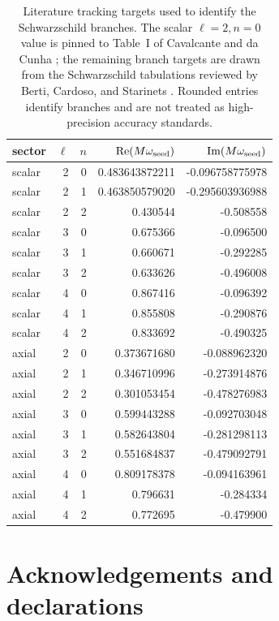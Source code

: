 \documentclass[12pt,a4paper]{article}
\begin{document}
\begin{table}[H]
\centering
\scriptsize
\setlength{\tabcolsep}{4pt}
\begin{tabular}{lrrrr}
\toprule
sector & \(\ell\) & \(n\) & \(\operatorname{Re}(M\omega_{\rm seed})\) & \(\operatorname{Im}(M\omega_{\rm seed})\)\\
\midrule
scalar & 2 & 0 & 0.483643872211 & -0.096758775978\\
scalar & 2 & 1 & 0.463850579020 & -0.295603936988\\
scalar & 2 & 2 & 0.430544 & -0.508558\\
scalar & 3 & 0 & 0.675366 & -0.096500\\
scalar & 3 & 1 & 0.660671 & -0.292285\\
scalar & 3 & 2 & 0.633626 & -0.496008\\
scalar & 4 & 0 & 0.867416 & -0.096392\\
scalar & 4 & 1 & 0.855808 & -0.290876\\
scalar & 4 & 2 & 0.833692 & -0.490325\\
axial & 2 & 0 & 0.373671680 & -0.088962320\\
axial & 2 & 1 & 0.346710996 & -0.273914876\\
axial & 2 & 2 & 0.301053454 & -0.478276983\\
axial & 3 & 0 & 0.599443288 & -0.092703048\\
axial & 3 & 1 & 0.582643804 & -0.281298113\\
axial & 3 & 2 & 0.551684837 & -0.479092791\\
axial & 4 & 0 & 0.809178378 & -0.094163961\\
axial & 4 & 1 & 0.796631 & -0.284334\\
axial & 4 & 2 & 0.772695 & -0.479900\\
\bottomrule
\end{tabular}
\caption{Literature tracking targets used to identify the Schwarzschild
branches. The scalar \(\ell=2,n=0\) value is pinned to Table~I of Cavalcante
and da Cunha \cite{Cavalcante2021}; the remaining branch targets are drawn from
the Schwarzschild tabulations reviewed by Berti, Cardoso, and Starinets
\cite{Berti2009}. Rounded entries identify branches and are not treated as
high-precision accuracy standards.}
\label{tab:schwarzschildseeds}
\end{table}
\color{black}

\section*{Acknowledgements and declarations}
\end{document}
